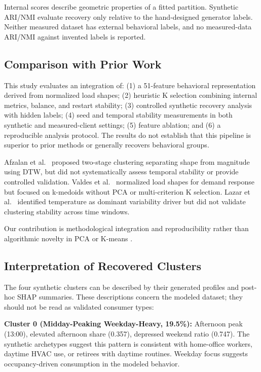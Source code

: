 \documentclass[11pt,a4paper]{article}
\begin{document}
Internal scores describe geometric properties of a fitted partition. Synthetic ARI/NMI evaluate recovery only relative to the hand-designed generator labels. Neither measured dataset has external behavioral labels, and no measured-data ARI/NMI against invented labels is reported.

\subsection{Comparison with Prior Work}

This study evaluates an integration of: (1) a 51-feature behavioral representation derived from normalized load shapes; (2) heuristic K selection combining internal metrics, balance, and restart stability; (3) controlled synthetic recovery analysis with hidden labels; (4) seed and temporal stability measurements in both synthetic and measured-client settings; (5) feature ablation; and (6) a reproducible analysis protocol. The results do not establish that this pipeline is superior to prior methods or generally recovers behavioral groups.

Afzalan et al.~\cite{afzalan2020twostage} proposed two-stage clustering separating shape from magnitude using DTW, but did not systematically assess temporal stability or provide controlled validation. Valdes et al.~\cite{valdes2021smart} normalized load shapes for demand response but focused on k-medoids without PCA or multi-criterion K selection. Lazar et al.~\cite{lazar2021investigating} identified temperature as dominant variability driver but did not validate clustering stability across time windows.

Our contribution is methodological integration and reproducibility rather than algorithmic novelty in PCA \cite{jolliffe2002pca} or K-means \cite{lloyd1982least,arthur2007kmeans}.

\subsection{Interpretation of Recovered Clusters}

The four synthetic clusters can be described by their generated profiles and post-hoc SHAP summaries. These descriptions concern the modeled dataset; they should not be read as validated consumer types:

\textbf{Cluster 0 (Midday-Peaking Weekday-Heavy, 19.5\%):} Afternoon peak (13:00), elevated afternoon share (0.357), depressed weekend ratio (0.747). The synthetic archetypes suggest this pattern is consistent with home-office workers, daytime HVAC use, or retirees with daytime routines. Weekday focus suggests occupancy-driven consumption in the modeled behavior.
\end{document}
